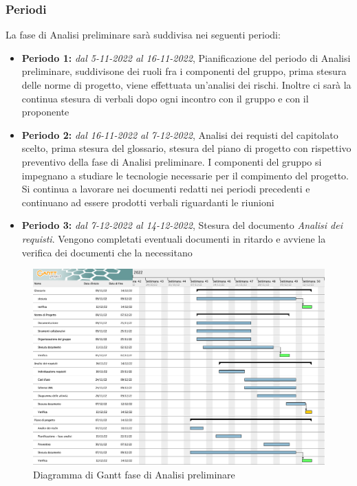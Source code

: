 \subsubsection{Periodi}
La fase di Analisi preliminare sarà suddivisa nei seguenti periodi:
\begin{itemize}
\item \textbf{Periodo 1:} \textit{dal 5-11-2022 al 16-11-2022},  Pianificazione del periodo di Analisi preliminare,  suddivisone dei ruoli fra i componenti del gruppo,  prima stesura delle norme di progetto, viene effettuata un'analisi dei rischi.  Inoltre ci sarà la continua stesura di verbali dopo ogni incontro con il gruppo e con il proponente
\item \textbf{Periodo 2:} \textit{dal 16-11-2022 al 7-12-2022},  Analisi dei requisti del capitolato scelto,  prima stesura del glossario, stesura del piano di progetto con rispettivo preventivo della fase di Analisi preliminare.  I componenti del gruppo si impegnano a studiare le tecnologie necessarie per il compimento del progetto. Si continua a lavorare nei documenti redatti nei periodi precedenti e continuano ad essere prodotti verbali riguardanti le riunioni
\item \textbf{Periodo 3: } \textit{dal 7-12-2022 al 14-12-2022}, Stesura del documento \textit{Analisi dei requisti}. Vengono completati eventuali documenti in ritardo e avviene la verifica dei documenti che la necessitano
\end{itemize}

\begin{figure}[H]
    \centering
    \includegraphics[scale=0.38]{image/analisi_preliminare_gantt.png}
    \caption{Diagramma di Gantt fase di Analisi preliminare}
\end{figure}
\pagebreak

